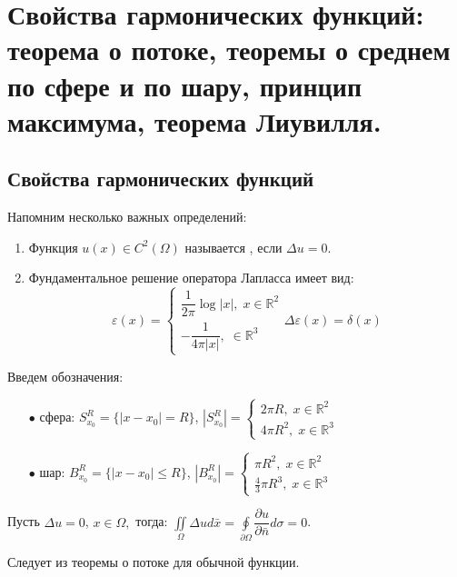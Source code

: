 \chapter{Свойства гармонических функций: теорема о потоке, теоремы о среднем по сфере и по шару, принцип максимума, теорема Лиувилля.}
\label{cha:18}

\section*{Свойства гармонических функций}

\begin{remem}\label{lec:18/remem:1}
	Напомним несколько важных определений:
	\begin{enumerate}
		\item 
			Функция $ u(x) \in C^2(\Omega)$ называется , если $\Delta u = 0$.
		\item
			Фундаментальное решение оператора Лапласса имеет вид:
			$$\varepsilon(x) = 
			\begin{cases}
				\dfrac{1}{2\pi} \log|x|, \; x \in \mathbb{R}^2 \\
				-\dfrac{1}{4\pi |x|}, \; \in \mathbb{R}^3
			\end{cases}  \Delta \varepsilon(x) = \delta(x)$$
	\end{enumerate}
\end{remem}
Введем обозначения:
\begin{itemize}
	\item[$\bullet$] 
		сфера: $\displaystyle S_{x_0}^{R} = \lbrace |x - x_0| = R \rbrace$, 
		$|S_{x_0}^{R}| = 
		\begin{cases}
			2\pi R, \; x \in \mathbb{R}^2 \\
			4\pi R^2, \; x \in \mathbb{R}^3 
		\end{cases}$
	\item[$\bullet$] 
		шар: $\displaystyle B_{x_0}^{R} = \lbrace |x - x_0| \leq R \rbrace$, $|B_{x_0}^{R}| = 
		\begin{cases}
			\pi R^2, \; x \in \mathbb{R}^2 \\
			\frac{4}{3}\pi R^3, \; x \in \mathbb{R}^3 
		\end{cases}$
\end{itemize}

\begin{theorem}
	$\;$\\
	Пусть $ \Delta u = 0$, $ x \in \Omega, $ тогда:
	$ \displaystyle \iint \limits_{\Omega} \Delta u d\bar{x} = \oint\limits_{\partial \Omega} \dfrac{\partial u}{\partial \bar{n}} d\sigma = 0$.
\end{theorem}
\begin{Proof}
	Следует из теоремы о потоке для обычной функции.
\end{Proof}


